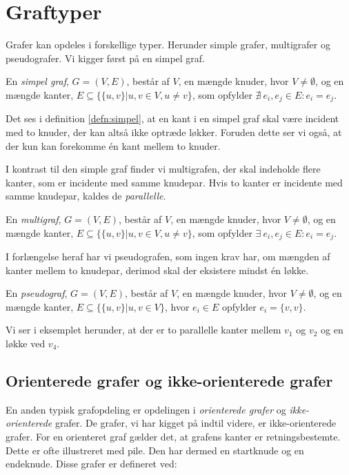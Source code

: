 \section{Graftyper}
Grafer kan opdeles i forskellige typer. Herunder simple grafer, multigrafer og pseudografer. Vi kigger først på en simpel graf.

\begin{defn} \label{defn:simpel}
En \emph{simpel graf}, $G=(V,E)$, består af $V$, en mængde knuder, hvor $V \neq \emptyset$, og en mængde kanter, $E \subseteq \{\{u,v\}|u,v \in V, u \neq v\}$, som opfylder $\nexists \ e_i, e_j \in E : e_i = e_j$.
\end{defn}

Det ses i definition \ref{defn:simpel}, at en kant i en simpel graf skal være incident med to knuder, der kan altså ikke optræde løkker. Foruden dette ser vi også, at der kun kan forekomme én kant mellem to knuder.



I kontrast til den simple graf finder vi multigrafen, der skal indeholde flere kanter, som er incidente med samme knudepar. Hvis to kanter er incidente med samme knudepar, kaldes de \emph{parallelle}.

\begin{defn}[Multigraf] \label{defn:multi}
En \emph{multigraf}, $ G = (V,E)$, består af $V$, en mængde knuder, hvor $V \neq \emptyset$, og en mængde kanter,
$E \subseteq \{\{u,v\}|u,v \in V, u \neq v\}$, som opfylder $\exists \ e_i, e_j \in E : e_i = e_j$.
\end{defn}



I forlængelse heraf har vi pseudografen, som ingen krav har, om mængden af kanter mellem to knudepar, derimod skal der eksistere mindst én løkke. 

\begin{defn}[Pseudograf] \label{defn:pseudo}
En \emph{pseudograf}, $ G = (V,E)$, består af $V$, en mængde knuder, hvor $V \neq \emptyset$, og en mængde kanter, $E \subseteq \{\{u,v\}|u,v \in V\}$, hvor $e_i \in E$ opfylder $e_i = \{v,v\}$.
\end{defn}

Vi ser i eksemplet herunder, at der er to parallelle kanter mellem $v_{1}$ og $v_{2}$ og en løkke ved $v_{4}$.




\subsection{Orienterede grafer og ikke-orienterede grafer}
En anden typisk grafopdeling er opdelingen i \emph{orienterede grafer} og \emph{ikke-orienterede} grafer. De grafer, vi har kigget på indtil videre, er ikke-orienterede grafer. For en orienteret graf gælder det, at grafens kanter er retningsbestemte. Dette er ofte illustreret med pile. Den har dermed en startknude og en endeknude. Disse grafer er defineret ved:

